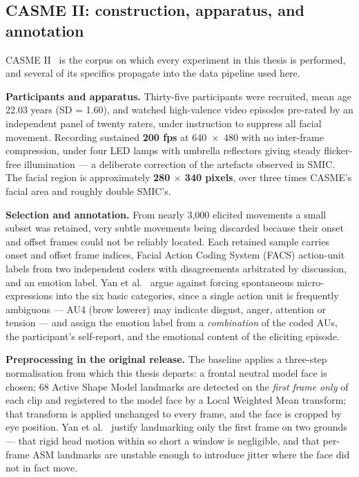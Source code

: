 \subsection{CASME II: construction, apparatus, and annotation}
\label{sec:casme2-construction}

CASME II~\cite{yan2014} is the corpus on which every experiment in this thesis is performed, and several of its specifics propagate into the data pipeline used here.

\textbf{Participants and apparatus.} Thirty-five participants were recruited, mean age 22.03 years (SD = 1.60), and watched high-valence video episodes pre-rated by an independent panel of twenty raters, under instruction to suppress all facial movement. Recording sustained \textbf{200 fps} at 640~$\times$~480 with no inter-frame compression, under four LED lamps with umbrella reflectors giving steady flicker-free illumination --- a deliberate correction of the artefacts observed in SMIC. The facial region is approximately \textbf{280 $\times$ 340 pixels}, over three times CASME's facial area and roughly double SMIC's.

\textbf{Selection and annotation.} From nearly 3,000 elicited movements a small subset was retained, very subtle movements being discarded because their onset and offset frames could not be reliably located. Each retained sample carries onset and offset frame indices, Facial Action Coding System (FACS) action-unit labels from two independent coders with disagreements arbitrated by discussion, and an emotion label. Yan et al.~\cite{yan2014} argue against forcing spontaneous micro-expressions into the six basic categories, since a single action unit is frequently ambiguous --- AU4 (brow lowerer) may indicate disgust, anger, attention or tension --- and assign the emotion label from a \textit{combination} of the coded AUs, the participant's self-report, and the emotional content of the eliciting episode.

\textbf{Preprocessing in the original release.} The baseline applies a three-step normalisation from which this thesis departs: a frontal neutral model face is chosen; 68 Active Shape Model landmarks are detected on the \textit{first frame only} of each clip and registered to the model face by a Local Weighted Mean transform; that transform is applied unchanged to every frame, and the face is cropped by eye position. Yan et al.~\cite{yan2014} justify landmarking only the first frame on two grounds --- that rigid head motion within so short a window is negligible, and that per-frame ASM landmarks are unstable enough to introduce jitter where the face did not in fact move.

